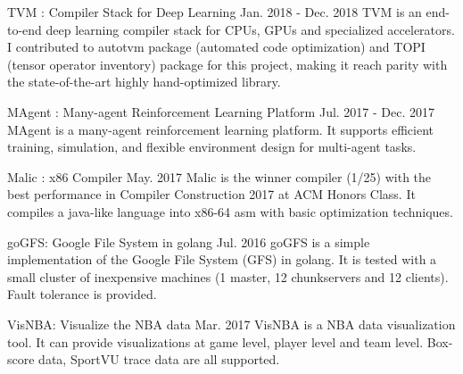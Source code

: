 

\begin{cventries}

  \cventry
    {} %
	{TVM : Compiler Stack for Deep Learning } %
	{Jan. 2018 - Dec. 2018} %
	{} %
	{
		TVM is an end-to-end deep learning compiler stack for CPUs, GPUs and specialized accelerators. I contributed to autotvm package (automated code optimization) and TOPI (tensor operator inventory) package for this project, making it reach parity with the state-of-the-art highly hand-optimized library.
	}

  \cventry
	{} %
	{MAgent : Many-agent Reinforcement Learning Platform } %
	{Jul. 2017 - Dec. 2017} %
	{} %
	{
		MAgent is a many-agent reinforcement learning platform. It supports efficient training, simulation, and flexible environment design for multi-agent tasks.
	}	


  \cventry
    {} %
    {Malic : x86 Compiler
    	 	} %
    {May. 2017} %
    {} %
    {
      Malic is the winner compiler (1/25) with the best performance in Compiler Construction 2017 at ACM Honors Class. It compiles a java-like language into x86-64 asm with basic optimization techniques.
    }

  \cventry
    {} %
    {goGFS: Google File System in golang } %
    {Jul. 2016} %
    {} %
    {
        goGFS is a simple implementation of the Google File System (GFS) in golang.
        It is tested with a small cluster of inexpensive machines (1 master, 12 chunkservers and 12 clients).
        Fault tolerance is provided.
    }

  \cventry
    {} %
    {VisNBA: Visualize the NBA data } %
    {Mar. 2017} %
    {} %
    {
        VisNBA is a NBA data visualization tool. It can provide visualizations at game level, player level and team level. Box-score data, SportVU trace data are all supported.
    }


\end{cventries}
